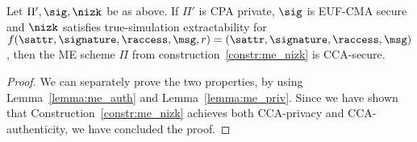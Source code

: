 \begin{theorem}\label{theo:me_nizk}
    Let $\Pi', \sig, \nizk$ be as above.
    If $\Pi'$ is CPA private, $\sig$ is EUF-CMA secure and $\nizk$ satisfies true-simulation extractability for $f(\sattr, \signature, \raccess, \msg, r) = (\sattr, \signature, \raccess, \msg)$, then the ME scheme $\Pi$ from construction~\ref{constr:me_nizk} is CCA-secure.
\end{theorem}

\begin{proof}
    We can separately prove the two properties, by using Lemma~\ref{lemma:me_auth} and Lemma~\ref{lemma:me_priv}.
    Since we have shown that Construction~\ref{constr:me_nizk} achieves both CCA-privacy and CCA-authenticity, we have concluded the proof.
\end{proof}